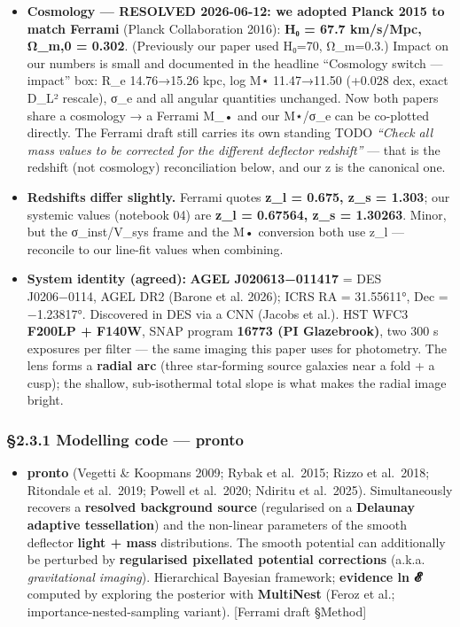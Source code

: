 \documentclass[
]{article}
\providecommand{\tightlist}{%
  \setlength{\itemsep}{0pt}\setlength{\parskip}{0pt}}
\newcommand{\BreakablePath}[1]{{\ttfamily\sloppy #1}}
\begin{document}
\begin{itemize}
\tightlist
\item
  \textbf{Cosmology --- RESOLVED 2026-06-12: we adopted Planck 2015 to
  match Ferrami} (Planck Collaboration 2016): \textbf{H₀ = 67.7
  km/s/Mpc, Ω\_m,0 = 0.302}. (Previously our paper used H₀=70,
  Ω\_m=0.3.) Impact on our numbers is small and documented in the
  headline ``Cosmology switch --- impact'' box: R\_e 14.76→15.26 kpc,
  log M⋆ 11.47→11.50 (+0.028 dex, exact D\_L² rescale), σ\_e and all
  angular quantities unchanged. Now both papers share a cosmology → a
  Ferrami M\_• and our M⋆/σ\_e can be co-plotted directly. The Ferrami
  draft still carries its own standing TODO \emph{``Check all mass
  values to be corrected for the different deflector redshift''} ---
  that is the redshift (not cosmology) reconciliation below, and our z
  is the canonical one.
\item
  \textbf{Redshifts differ slightly.} Ferrami quotes \textbf{z\_l =
  0.675, z\_s = 1.303}; our systemic values (notebook 04) are
  \textbf{z\_l = 0.67564, z\_s = 1.30263}. Minor, but the σ\_inst/V\_sys
  frame and the M• conversion both use z\_l --- reconcile to our
  line-fit values when combining.
\item
  \textbf{System identity (agreed):} \textbf{AGEL J020613−011417} = DES
  J0206−0114, AGEL DR2 (Barone et al. 2026); ICRS RA = 31.55611°, Dec =
  −1.23817°. Discovered in DES via a CNN (Jacobs et al.). HST WFC3
  \textbf{F200LP + F140W}, SNAP program \textbf{16773 (PI Glazebrook)},
  two 300 s exposures per filter --- the same imaging this paper uses
  for photometry. The lens forms a \textbf{radial arc} (three
  star-forming source galaxies near a fold + a cusp); the shallow,
  sub-isothermal total slope is what makes the radial image bright.
\end{itemize}

\hypertarget{modelling-code-pronto}{%
\subsubsection{\texorpdfstring{§2.3.1 Modelling code ---
\BreakablePath{pronto}}{§2.3.1 Modelling code --- }}\label{modelling-code-pronto}}

\begin{itemize}
\tightlist
\item
  \textbf{\BreakablePath{pronto}} (Vegetti \& Koopmans 2009; Rybak et
  al.~2015; Rizzo et al.~2018; Ritondale et al.~2019; Powell et
  al.~2020; Ndiritu et al.~2025). Simultaneously recovers a
  \textbf{resolved background source} (regularised on a \textbf{Delaunay
  adaptive tessellation}) and the non-linear parameters of the smooth
  deflector \textbf{light + mass} distributions. The smooth potential
  can additionally be perturbed by \textbf{regularised pixellated
  potential corrections} (a.k.a. \emph{gravitational imaging}).
  Hierarchical Bayesian framework; \textbf{evidence ln 𝓔} computed by
  exploring the posterior with \textbf{MultiNest} (Feroz et al.;
  importance-nested-sampling variant). {[}Ferrami draft §Method{]}
\end{itemize}
\end{document}
